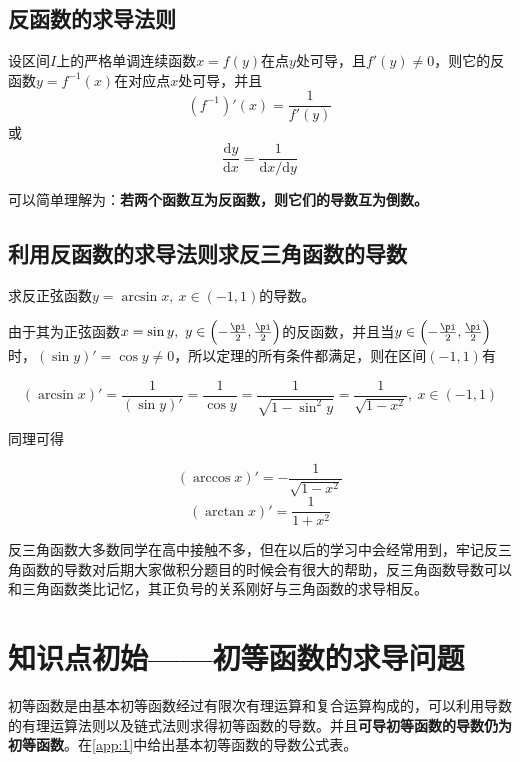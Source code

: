 \subsection{反函数的求导法则}\label{sec:2.4.1}

设区间$I$上的严格单调连续函数$x=f(y)$在点$y$处可导，且$f'(y)\neq{0}$，则它的反函数$y=f^{-1}(x)$在对应点$x$处可导，并且
\begin{equation}
	(f^{-1})'(x)=\frac{1}{f'(y)}\label{eq:2.5}
\end{equation}
或
\begin{equation}
	\frac{\mathrm{d}y}{\mathrm{d}x}=\frac{1}{\mathrm{d}x/\mathrm{d}y}\label{eq:2.6}
\end{equation}

可以简单理解为：\textbf{若两个函数互为反函数，则它们的导数互为倒数。}

\subsection{利用反函数的求导法则求反三角函数的导数}\label{sec:2.4.2}
\begin{example}
	求反正弦函数$y=\arcsin{x},~x\in{(-1,1)}$的导数。
	
	由于其为正弦函数$x=\sin{y},~y\in{\qty(-\frac{\pi}{2},\frac{\pi}{2})}$的反函数，并且当$y\in{\qty(-\frac{\pi}{2},\frac{\pi}{2})}$时，$(\sin{y})'=\cos{y}\neq{0}$，所以定理的所有条件都满足，则在区间$(-1,1)$有
	
	\[(\arcsin{x})'=\frac{1}{(\sin{y})'}=\frac{1}{\cos{y}}=\frac{1}{\sqrt{1-\sin^2{y}}}=\frac{1}{\sqrt{1-x^2}},~ x\in{(-1,1)}\]
	
	同理可得
	
	\[(\arccos{x})'=-\frac{1}{\sqrt{1-x^2}}\]
	\[(\arctan{x})'=\frac{1}{1+x^2}\]
\end{example}

\begin{remark}
	反三角函数大多数同学在高中接触不多，但在以后的学习中会经常用到，牢记反三角函数的导数对后期大家做积分题目的时候会有很大的帮助，反三角函数导数可以和三角函数类比记忆，其正负号的关系刚好与三角函数的求导相反。
\end{remark}

\section{知识点初始——初等函数的求导问题}\label{sec:2.5}

初等函数是由基本初等函数经过有限次有理运算和复合运算构成的，可以利用导数的有理运算法则以及链式法则求得初等函数的导数。并且\textbf{可导初等函数的导数仍为初等函数}。在\textcolor{lbexacolor}{\ref{app:1}}中给出基本初等函数的导数公式表。


